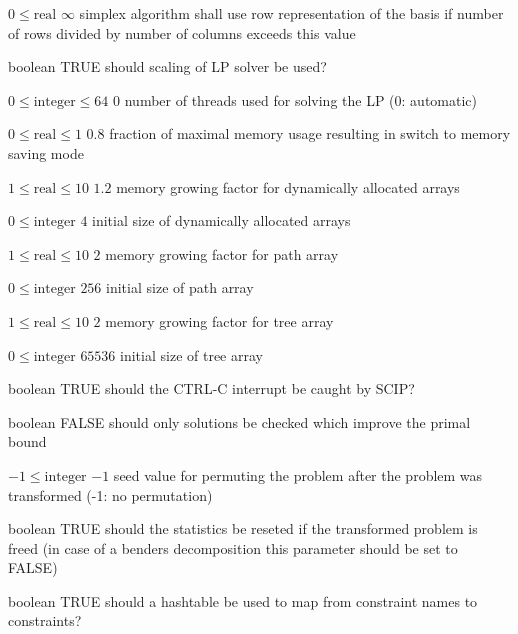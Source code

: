 %
{$0\leq\textrm{real}$}%
{$\infty$}%
{simplex algorithm shall use row representation of the basis if number of rows divided by number of columns exceeds this value}%
{}

%
{boolean}%
{TRUE}%
{should scaling of LP solver be used?}%
{}

%
{$0\leq\textrm{integer}\leq64$}%
{$0$}%
{number of threads used for solving the LP (0: automatic)}%
{}

%
{$0\leq\textrm{real}\leq1$}%
{$0.8$}%
{fraction of maximal memory usage resulting in switch to memory saving mode}%
{}

%
{$1\leq\textrm{real}\leq10$}%
{$1.2$}%
{memory growing factor for dynamically allocated arrays}%
{}

%
{$0\leq\textrm{integer}$}%
{$4$}%
{initial size of dynamically allocated arrays}%
{}

%
{$1\leq\textrm{real}\leq10$}%
{$2$}%
{memory growing factor for path array}%
{}

%
{$0\leq\textrm{integer}$}%
{$256$}%
{initial size of path array}%
{}

%
{$1\leq\textrm{real}\leq10$}%
{$2$}%
{memory growing factor for tree array}%
{}

%
{$0\leq\textrm{integer}$}%
{$65536$}%
{initial size of tree array}%
{}

%
{boolean}%
{TRUE}%
{should the CTRL-C interrupt be caught by SCIP?}%
{}

%
{boolean}%
{FALSE}%
{should only solutions be checked which improve the primal bound}%
{}

%
{$-1\leq\textrm{integer}$}%
{$-1$}%
{seed value for permuting the problem after the problem was transformed (-1: no permutation)}%
{}

%
{boolean}%
{TRUE}%
{should the statistics be reseted if the transformed problem is freed (in case of a benders decomposition this parameter should be set to FALSE)}%
{}

%
{boolean}%
{TRUE}%
{should a hashtable be used to map from constraint names to constraints?}%
{}

